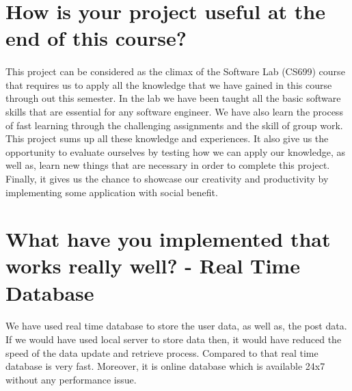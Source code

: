 \documentclass[12pt, a4paper]{article}
\begin{document}
\newpage
\section{How is your project useful at the end of this course?}
\paragraph{}
This project can be considered as the climax of the Software Lab (CS699) course that requires us to apply all the knowledge that we have gained in this course through out this semester. In the lab we have been taught all the basic software skills that are essential for any software engineer. We have also learn the process of fast learning through the challenging assignments and the skill of group work. This project sums up all these knowledge and experiences. It also give us the opportunity to evaluate ourselves by testing how we can apply our knowledge, as well as, learn new things that are necessary in order to complete this project. Finally, it gives us the chance to showcase our creativity and productivity by implementing some application with social benefit.



\section{What have you implemented that works really well? - Real Time Database}
\paragraph{}
We have used real time database to store the user data, as well as, the post data. If we would have used local server to store data then, it would have reduced the speed of the data update and retrieve process. Compared to that real time database is very fast. Moreover, it is online database which is available 24x7 without any performance issue. 
\end{document}
